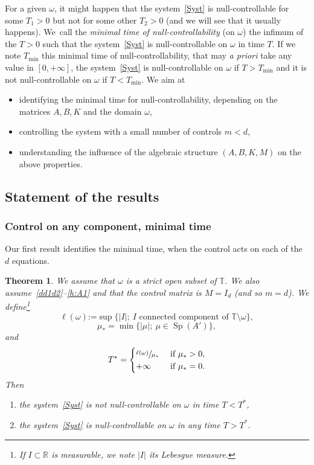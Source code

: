 \documentclass[11pt]{article}
\newcommand{\Subsection}{\subsection}
\theoremstyle{plain}
\newtheorem{theorem}{Theorem}
\theoremstyle{definition}
\theoremstyle{remark}
\DeclareMathOperator{\Sp}{Sp}
\newcommand{\set}{\mathbb}
\newcommand{\T}{\set{T}}
\newcommand{\coloneqq}{\mathrel{\mathord{:}\mathord=}}
\begin{document}
For a given $\omega$, it might happen that the system~\eqref{Syst} is null-controllable for some $T_1>0$ but not for some other $T_2>0$ (and we will see that it usually happens). We~call the \emph{minimal time of null-controllability} (on $\omega$) the infimum of the $T>0$ such that the system~\eqref{Syst} is null-controllable on $\omega$ in time $T$. If we note $T_{\mathrm{min}}$ this minimal time of null-controllability, that may \emph{a priori} take any value in $[0,+\infty]$, the system~\eqref{Syst} is null-controllable on $\omega$ if $T>T_{\mathrm{min}}$ and it is not null-controllable on $\omega$ if $T<T_{\mathrm{min}}$. We aim at
\begin{itemize}
\item identifying the minimal time for null-controllability, depending on the matrices $A,B,K$ and the domain $\omega$,
\item controlling the system with a small number of controls $m<d$,
\item understanding the influence of the algebraic structure $(A,B,K,M)$ on the above properties.
\end{itemize}

\Subsection{Statement of the results}

\subsubsection{Control on any component, minimal time}

Our first result identifies the minimal time, when the control acts on each of the $d$ equations.
\begin{theorem}\label{th:main}
We assume that $\omega$ is a strict open subset of $\set T$. We also assume~\eqref{dd1d2}--\eqref{h:A1} and that the control matrix is $M=I_d$ (and so $m=d$).
We define\footnote{If $I\subset \set R$ is measurable, we note $|I|$ its Lebesgue measure.}
\begin{equation}\label{eq:def_l}\ell(\omega) \coloneqq \sup\{ |I|;\ I \text{ connected component of } \T \setminus \omega \},\end{equation}
\[
\mu_*=\min\{ |\mu|;\ \mu \in \Sp(A') \},
\]
and
\begin{equation}\label{eq:T}
T^\ast =
\begin{cases}
\sfrac{\ell(\omega)}{\mu_*} & \text{ if } \mu_* >0, \\
+\infty & \text{ if } \mu_*=0.
\end{cases}
\end{equation}
Then
\begin{enumerate}
\item
\label{th:maini} the system~\eqref{Syst} is not null-controllable on $\omega$ in time $T<T^\ast$,
\item\label{th:mainii} the system~\eqref{Syst} is null-controllable on $\omega$ in any time $T>T^\ast$.
\end{enumerate}
\end{theorem}
\end{document}
